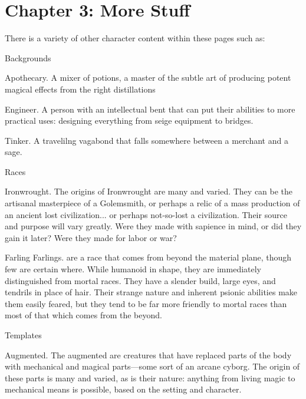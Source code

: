 \documentclass[11pt,twoside,openany]{book}  %
\begin{document}
\section*{Chapter 3: More Stuff}
There is a variety of other character content within these pages such as:
\begin{fiveitemize}
	\item Backgrounds
		\begin{fiveitemize}
			\item Apothecary. A mixer of potions, a master of the subtle art of producing potent magical effects from the right distillations
			\item Engineer. A person with an intellectual bent that can put their abilities to more practical uses: designing everything from seige equipment to bridges.
			\item Tinker. A travelilng vagabond that falls somewhere between a merchant and a sage.
		\end{fiveitemize}
	\item Races
		\begin{fiveitemize}
			\item Ironwrought. The origins of Ironwrought are many and varied. They can be the artisanal masterpiece of a Golemsmith, or perhaps a relic of a mass production of an ancient lost civilization... or perhaps not-so-lost a civilization. Their source and purpose will vary greatly. Were they made with sapience in mind, or did they gain it later? Were they made for labor or war?
			\item Farling Farlings. are a race that comes from beyond the material plane, though few are certain where. While humanoid in shape, they are immediately distinguished from mortal races. They have a slender build, large eyes, and tendrils in place of hair. Their strange nature and inherent psionic abilities make them easily feared, but they tend to be far more friendly to mortal races than most of that which comes from the beyond.
		\end{fiveitemize}
	\item Templates
		\begin{fiveitemize}
			\item Augmented. The augmented are creatures that have replaced parts of the body with mechanical and magical parts—some sort of an arcane cyborg. The origin of these parts is many and varied, as is their nature: anything from living magic to mechanical means is possible, based on the setting and character.

\end{fiveitemize}
\end{fiveitemize}
\end{document}
